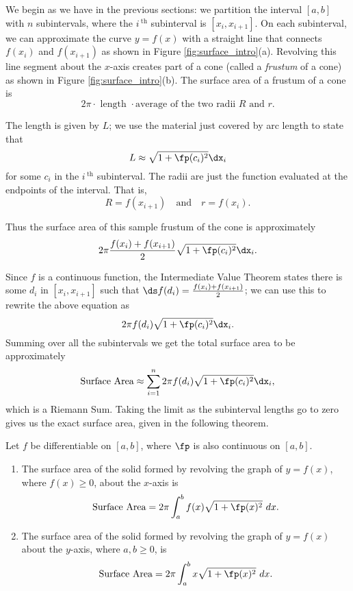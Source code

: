 We begin as we have in the previous sections: we partition the interval $[a,b]$ with $n$ subintervals, where the $i\,^{\text{th}}$ subinterval is $[x_i,x_{i+1}]$. On each subinterval, we can approximate the curve $y=f(x)$ with a straight line that connects $f(x_i)$ and $f(x_{i+1})$ as shown in Figure \ref{fig:surface_intro}(a). Revolving this line segment about the $x$-axis creates part of a cone (called a \textit{frustum} of a cone) as shown in Figure \ref{fig:surface_intro}(b). The surface area of a frustum of a cone is $$2\pi\cdot\text{ length }\cdot\text{average of the two radii $R$ and $r$}.$$

The length is given by $L$; we use the material just covered by arc length to state that $$L\approx \sqrt{1+\fp(c_i)^2}\dx_i$$ for some $c_i$ in the $i\,^\text{th}$ subinterval. The radii are just the function evaluated at the endpoints of the interval. That is, $$R = f(x_{i+1})\quad \text{and}\quad r = f(x_i).$$

Thus the surface area of this sample frustum of the cone is approximately 
$$2\pi\frac{f(x_i)+f(x_{i+1})}2\sqrt{1+\fp(c_i)^2}\dx_i.$$

Since $f$ is a continuous function, the Intermediate Value Theorem states there is some $d_i$ in $[x_i,x_{i+1}]$ such that $\ds f(d_i) = \frac{f(x_i)+f(x_{i+1})}2$; we can use this to rewrite the above equation as
$$2\pi f(d_i)\sqrt{1+\fp(c_i)^2}\dx_i.$$
Summing over all the subintervals we get the total surface area to be approximately 
$$\text{Surface Area}\approx \sum_{i=1}^n 2\pi f(d_i)\sqrt{1+\fp(c_i)^2}\dx_i,$$
which is a Riemann Sum. Taking the limit as the subinterval lengths go to zero gives us the exact surface area, given in the following theorem.

{Let $f$ be differentiable on  $[a,b]$, where $\fp$ is also continuous on $[a,b]$. 
	\begin{enumerate}
	\item	The surface area of the solid formed by revolving the graph of $y=f(x)$, where $f(x)\geq0$, about the $x$-axis is
	$$\text{Surface Area} = 2\pi\int_a^b f(x)\sqrt{1+\fp(x)^2}\ dx.$$
	\item	The surface area of the solid formed by revolving the graph of $y=f(x)$ about the $y$-axis, where $a,b\geq0$, is
	$$\text{Surface Area} = 2\pi\int_a^b x\sqrt{1+\fp(x)^2}\ dx.$$
	\end{enumerate}
}

